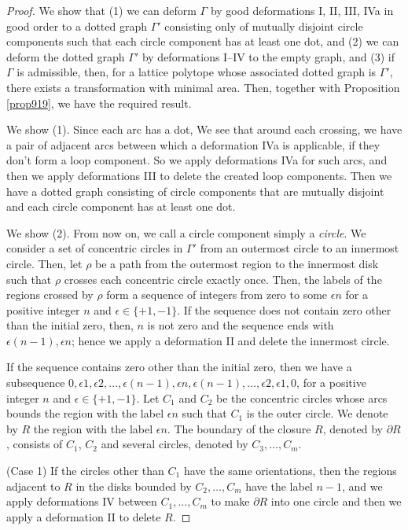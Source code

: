 \documentclass[a4paper,11pt]{amsart}
\numberwithin{equation}{section}
\begin{document}
\begin{proof}
We show that (1) we can deform $\Gamma$ by good deformations I, II, III, IVa in good order to a dotted graph $\Gamma'$ consisting only of mutually disjoint circle components such that each circle component has at least one dot, and (2) we can deform the dotted graph $\Gamma'$ by deformations I--IV to the empty graph, and (3) if $\Gamma$ is admissible, then, for a lattice polytope whose associated dotted graph is $\Gamma'$, there exists a transformation with minimal area. Then, together with Proposition \ref{prop919}, we have the required result. 

We show (1). 
Since each arc has a dot, 
We see that around each crossing, we have a pair of adjacent arcs between which a deformation IVa is applicable, if they don't form a loop component. 
So we apply deformations IVa for such arcs, and then we apply deformations III to delete the created loop components. Then we have a dotted graph consisting of circle components that are mutually disjoint and each circle component has at least one dot. 

We show (2). 
From now on, we call a circle component simply a {\it circle}. 
We consider a set of concentric circles in $\Gamma'$ from an outermost circle to an innermost circle. Then, let $\rho$ be a path from the outermost region to the innermost disk such that $\rho$ crosses each concentric circle exactly once. 
Then, the labels of the regions crossed by $\rho$ form a sequence of integers from zero to some $\epsilon n$ for a positive integer $n$ and $\epsilon \in \{+1, -1\}$. If the sequence does not contain zero other than the initial zero, then, $n$ is not zero and the sequence ends with $\epsilon (n-1), \epsilon n$; hence we apply a deformation II and delete the innermost circle. 



If the sequence contains zero other than the initial zero, then we have a subsequence $0, \epsilon 1, \epsilon 2, \ldots, \epsilon (n-1), \epsilon n, \epsilon (n-1), \ldots, \epsilon 2, \epsilon 1, 0$, for a positive integer $n$ and  $\epsilon \in \{+1, -1\}$. Let $C_1$ and $C_2$ be the concentric circles  whose arcs bounds the region with the label $\epsilon n$ such that $C_1$ is the outer circle. We denote by $R$ the region with the label $\epsilon n$. 
The boundary of the closure $R$, denoted by $\partial R$, consists of $C_1$, $C_2$ and several circles, denoted by $C_3, \ldots, C_m$. 

(Case 1)
If the circles other than $C_1$ have the same orientations, then the regions adjacent to $R$ in the disks bounded by $C_2, \ldots, C_m$ have the label $n-1$, and we apply deformations IV between $C_1, \ldots, C_m$ to make $\partial R$ into one circle and then we apply a deformation II to delete $R$. 


\end{proof}
\end{document}
